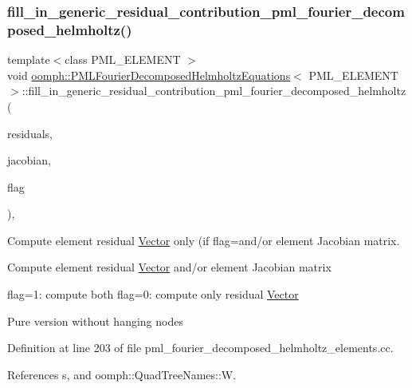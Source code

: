 \subsubsection{\texorpdfstring{fill\+\_\+in\+\_\+generic\+\_\+residual\+\_\+contribution\+\_\+pml\+\_\+fourier\+\_\+decomposed\+\_\+helmholtz()}{fill\_in\_generic\_residual\_contribution\_pml\_fourier\_decomposed\_helmholtz()}}
{\footnotesize\ttfamily template$<$class P\+M\+L\+\_\+\+E\+L\+E\+M\+E\+NT $>$ \\
void \hyperlink{classoomph_1_1PMLFourierDecomposedHelmholtzEquations}{oomph\+::\+P\+M\+L\+Fourier\+Decomposed\+Helmholtz\+Equations}$<$ P\+M\+L\+\_\+\+E\+L\+E\+M\+E\+NT $>$\+::fill\+\_\+in\+\_\+generic\+\_\+residual\+\_\+contribution\+\_\+pml\+\_\+fourier\+\_\+decomposed\+\_\+helmholtz (\begin{DoxyParamCaption}\item[{\hyperlink{classoomph_1_1Vector}{Vector}$<$ double $>$ \&}]{residuals,  }\item[{\hyperlink{classoomph_1_1DenseMatrix}{Dense\+Matrix}$<$ double $>$ \&}]{jacobian,  }\item[{const unsigned \&}]{flag }\end{DoxyParamCaption})\hspace{0.3cm}{\ttfamily [protected]}, {\ttfamily [virtual]}}



Compute element residual \hyperlink{classoomph_1_1Vector}{Vector} only (if flag=and/or element Jacobian matrix. 

Compute element residual \hyperlink{classoomph_1_1Vector}{Vector} and/or element Jacobian matrix

flag=1\+: compute both flag=0\+: compute only residual \hyperlink{classoomph_1_1Vector}{Vector}

Pure version without hanging nodes 

Definition at line 203 of file pml\+\_\+fourier\+\_\+decomposed\+\_\+helmholtz\+\_\+elements.\+cc.



References s, and oomph\+::\+Quad\+Tree\+Names\+::W.

\mbox{\label{classoomph_1_1PMLFourierDecomposedHelmholtzEquations_aa77f94ee3063a39d0e0cb7da973b155a}} 
